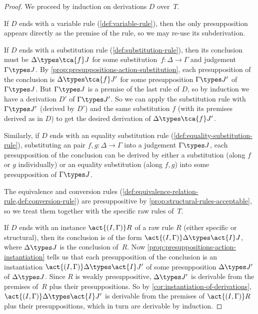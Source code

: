 \begin{proof}
  We proceed by induction on derivations $D$ over~$T$.

  If $D$ ends with a variable rule (\cref{def:variable-rule}), then the only presupposition appears directly as the premise of the rule, so we may re-use its subderivation.

  If $D$ ends with a substitution rule (\cref{def:substitution-rule}), then its conclusion must be $\Delta \types \tca{f} J$ for some substitution~$f : \Delta \to \Gamma$ and judgement~$\Gamma \types J$.
  By \cref{prop:presuppositions-action-substitution}, each presupposition of the conclusion is $\Delta \types \tca{f} J'$ for some presupposition $\Gamma \types J'$ of $\Gamma \types J$.
  But $\Gamma \types J$ is a premise of the last rule of $D$, so by induction we have a derivation $D'$ of $\Gamma \types J'$.
  So we  can apply the substitution rule with $\Gamma \types J'$ (derived by $D'$) and the same substitution $f$ (with its premises derived as in $D$) to get the desired derivation of $\Delta \types \tca{f} J'$.
  
  Similarly, if $D$ ends with an equality substitution rule (\cref{def:equality-substitution-rule}), substituting an pair $f,g : \Delta \to \Gamma$ into a judgement $\Gamma \types J$, each presupposition of the conclusion can be derived by either a substitution (along $f$ or $g$ individually) or an equality substitution (along $f,g$) into some presupposition of $\Gamma \types J$.

  The equivalence and conversion rules (\cref{def:equivalence-relation-rule,def:conversion-rule}) are presuppositive by \cref{prop:structural-rules-acceptable}, so we treat them together with the specific raw rules of~$T$.

  If $D$ ends with an instance $\act{(I,\Gamma)} R$ of a raw rule $R$ (either specific or structural), then its conclusion is of the form $\act{(I,\Gamma)} \Delta \types \act{I} J$, where $\Delta \types J$ is the conclusion of~$R$.
  Now \cref{prop:presuppositions-action-instantiation} tells us that each presupposition of the conclusion is an instantiation $\act{(I,\Gamma)} \Delta \types \act{I} J'$ of some presupposition $\Delta \types J'$ of $\Delta \types J$.
  Since $R$ is weakly presuppositive, $\Delta \types J'$ is derivable from the premises of~$R$ plus their presuppositions.
  So by \cref{cor:instantiation-of-derivations}, $\act{(I,\Gamma)} \Delta \types \act{I} J'$ is derivable from the premises of $\act{(I,\Gamma)} R$ plus their presuppositions, which in turn are derivable by induction.
\end{proof}

